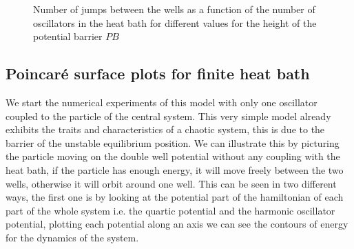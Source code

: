 \begin{figure}[H]%
    \centering
    \qquad
    \caption{Number of jumps between the wells as a function of the number of oscillators in the heat bath for different values for the height of the potential barrier $PB$}%
    \label{fig:changing_PB}%
\end{figure}


\subsection{Poincaré surface plots for finite heat bath}
We start the numerical experiments of this model with only one oscillator coupled to the particle of the central system. This very simple model already exhibits the traits and characteristics of a chaotic system, this is due to the barrier of the unstable equilibrium position. We can illustrate this by picturing the particle moving on the double well potential without any coupling with the heat bath, if the particle has enough energy, it will move freely between the two wells, otherwise it will orbit around one well. This can be seen in two different ways, the first one is by looking at the potential part of the hamiltonian of each part of the whole system i.e. the quartic potential and the harmonic oscillator potential, plotting each potential along an axis we can see the contours of energy for the dynamics of the system.

